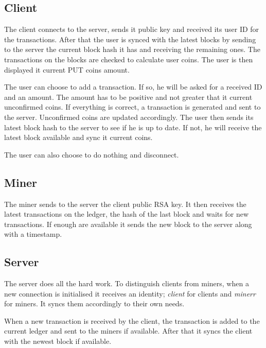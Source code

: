 \documentclass{article}
\begin{document}
\subsection{Client}
The client connects to the server, sends it public key and received its user ID for the transactions. After that the user is synced with the latest blocks by sending to the server the current block hash it has and receiving the remaining ones. The transactions on the blocks are checked to calculate user coins. The user is then displayed it current PUT coins amount. \\ \par

The user can choose to add a transaction. If so, he will be asked for a received ID and an amount. The amount has to be positive and not greater that it current unconfirmed coins. If everything is correct, a transaction is generated and sent to the server. Unconfirmed coins are updated accordingly. The user then sends its latest block hash to the server to see if he is up to date. If not, he will receive the latest block available and sync it current coins. \\ \par

The user can also choose to do nothing and disconnect.

\subsection{Miner}
The miner sends to the server the client public RSA key. It then receives the latest transactions on the ledger, the hash of the last block and waits for new transactions. If enough are available it sends the new block to the server along with a timestamp.

\subsection{Server}
The server does all the hard work. To distinguish clients from miners, when a new connection is initialised it receives an identity; \textit{client} for clients and \textit{minerr} for miners. It syncs them accordingly to their own needs. \\ \par

When a new transaction is received by the client, the transaction is added to the current ledger and sent to the miners if available. After that it syncs the client with the newest block if available. \\ \par
\end{document}
